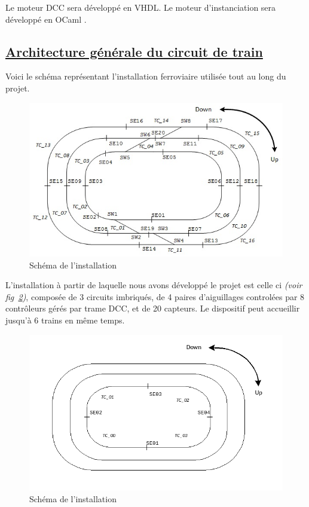 Le moteur DCC sera développé en VHDL. Le moteur d'instanciation sera
développé en OCaml \cite{OCAML}.


\newpage
\subsection{\underline{Architecture g\'en\'erale du circuit de train}}
\label{sec:archi}

Voici le sch\'ema repr\'esentant l'installation ferroviaire utilis\'ee
tout au long du projet. 

\begin{figure}[h]
\centering
\includegraphics[scale=0.55]{circuit_complet.jpg}
\caption{Sch\'ema de l'installation}
\label{fig4}
\end{figure}

L'installation à partir de laquelle nous avons développé le projet est
celle ci \emph{(voir fig~\ref{fig4})}, compos\'ee de 3
circuits imbriqués, de 4 paires d'aiguillages control\'ees par 8
contr\^oleurs gérés par trame DCC, et de 20 capteurs.
Le dispositif peut accueillir jusqu'\`a 6 trains en m\^eme temps.

\begin{figure}[h]
\centering
\includegraphics[scale=0.55]{circuit_vrai.png}
\caption{Sch\'ema de l'installation}
\label{fig4}
\end{figure}

